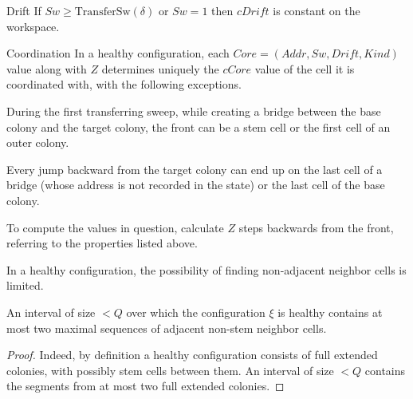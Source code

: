 \documentclass[12pt]{memoir}
\newcommand{\fld}[1]{\ensuremath{\textit{#1}}}
\newcommand{\Z}{Z}
\newcommand{\Addr}{\fld{Addr}}
\newcommand{\Core}{\fld{Core}}
\newcommand{\cCore}{\fld{cCore}}
\newcommand{\Drift}{\fld{Drift}}
\newcommand{\cDrift}{\fld{cDrift}}
\newcommand{\Info}{\fld{Info}}
\newcommand{\Kind}{\fld{Kind}}
\newcommand{\State}{\fld{State}}
\newcommand{\Sweep}{\fld{Sw}}
\newcommand{\TransferSw}{\mathrm{TransferSw}}
\begin{document}
\begin{definition}
\begin{flushdescription}





        \item[Drift]%
         If \( \Sweep \ge \TransferSw(\delta) \) or \( \Sweep=1 \) then \( \cDrift \)
         is constant on the workspace.

\item[Coordination]
 In a healthy configuration, each \( \Core =(\Addr, \Sweep, \Drift, \Kind) \) 
 value along with \( \Z \) determines uniquely the 
\( \cCore \) value of the cell it is coordinated with, with the following exceptions.
\begin{bullets}
\item During the first transferring sweep, while
    creating a bridge between the base colony and the target colony, 
    the front can be a stem cell or the first cell of an outer colony.
 \item Every jump backward from the target colony can end up on the last cell of a 
   bridge (whose address is not recorded in the state) or the last cell of the base colony.
\end{bullets}
 To compute the values in question, calculate \( \Z \) steps backwards from the front,
referring to the properties listed above.

   \end{flushdescription}
 \end{definition}

In a healthy configuration, the possibility of finding non-adjacent neighbor
cells is limited.

\begin{lemma}\label{lem:two-domains}
  An interval of size \( <Q \) over which the configuration \( \xi \) is healthy
contains at most two maximal sequences of adjacent non-stem neighbor cells.
\end{lemma}
\begin{proof}
Indeed, by definition a healthy configuration consists of full extended colonies, with 
possibly stem cells between them.
An interval of size \( <Q \) contains the segments from at most two full extended colonies.
\end{proof}
\end{document}
